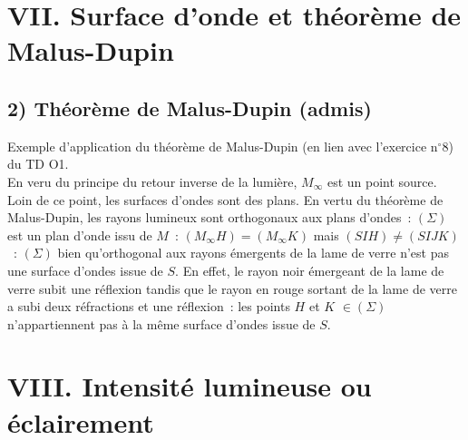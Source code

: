 \documentclass{article}
\begin{document}
\section*{VII. Surface d'onde et théorème de Malus-Dupin}
\subsection*{2) Théorème de Malus-Dupin (admis)}
Exemple d'application du théorème de Malus-Dupin (en lien avec
l'exercice n$^{\circ}$8) du TD O1. \\
En veru du principe du retour inverse de la lumière, $M_{\mathrm{\infty}}$
est un point source. Loin de ce point, les surfaces d'ondes sont des
plans. En vertu du théorème de Malus-Dupin, les rayons lumineux sont
orthogonaux aux plans d'ondes : $\left(\Sigma\right)$ est un plan d'onde issu
de $M$ : $\left(M_{\mathrm{\infty}}H\right) = \left(M_{\mathrm{\infty}}K\right)$ mais $(SIH) \neq (SIJK)$ :
$\left(\Sigma\right)$ bien qu'orthogonal aux rayons émergents de la lame de
verre n'est pas une surface d'ondes issue de $S$. En effet, le rayon
noir émergeant de la lame de verre subit une réflexion tandis que le
rayon en rouge sortant de la lame de verre a subi deux réfractions
et une réflexion : les points $H$ et $K$ $\in \left(\Sigma\right)$
n'appartiennent pas à la même surface d'ondes issue de $S$.

\section*{VIII. Intensité lumineuse ou éclairement}
\end{document}
